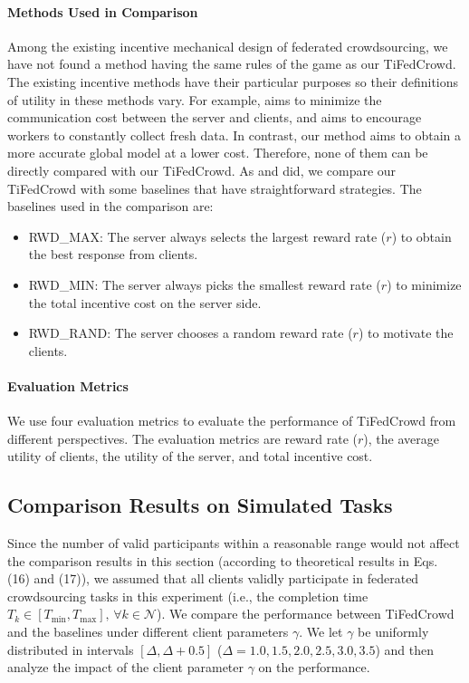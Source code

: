 \documentclass[final,1p,times]{elsarticle}
\begin{document}
\paragraph{\textbf{Methods Used in Comparison}}
Among the existing incentive mechanical design of federated crowdsourcing, we have not found a method having the same rules of the game as our TiFedCrowd. The existing incentive methods have their particular purposes so their definitions of utility in these methods vary. For example,  \cite{pandey2019incentivize} aims to minimize the communication cost between the server and clients, and \cite{kang2022incentive} aims to encourage workers to constantly collect fresh data. In contrast, our method aims to obtain a more accurate global model at a lower cost. Therefore, none of them can be directly compared with our TiFedCrowd. As \cite{pandey2019incentivize} and \cite{kang2022incentive} did, we compare our TiFedCrowd with some baselines that have straightforward strategies. The baselines used in the comparison are:
\begin{itemize}
	\item RWD\_MAX: The server always selects the largest reward rate ($r$) to obtain the best response from clients.  
	\item RWD\_MIN: The server always picks the smallest reward rate ($r$) to minimize the total incentive cost on the server side.
	\item RWD\_RAND: The server chooses a random reward rate ($r$) to motivate the clients.
\end{itemize}

\paragraph{\textbf{Evaluation Metrics}}
We use four evaluation metrics to evaluate the performance of TiFedCrowd from different perspectives. The evaluation metrics are reward rate ($r$), the average utility of clients, the utility of the server, and total incentive cost.

\subsection{Comparison Results on Simulated Tasks} \label{PCWB}
Since the number of valid participants within a reasonable range would not affect the comparison results in this section (according to theoretical results in Eqs. (16) and (17)), we assumed that all clients validly participate in federated crowdsourcing tasks in this experiment (i.e., the completion time $T_k\in[T_{\min},T_{\max}],\,\forall k\in\bm{\mathcal{N}}$). We compare the performance between TiFedCrowd and the baselines under different client parameters $\gamma$. We let $\gamma$ be uniformly distributed in intervals $[\Delta, \Delta + 0.5]$ ($\Delta = 1.0, 1.5, 2.0, 2.5, 3.0, 3.5$) and then analyze the impact of the client parameter $\gamma$ on the performance.
\end{document}
